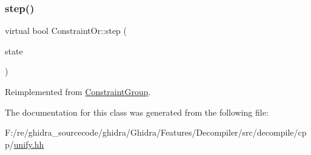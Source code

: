 \subsubsection{\texorpdfstring{step()}{step()}}
{\footnotesize\ttfamily virtual bool Constraint\+Or\+::step (\begin{DoxyParamCaption}\item[{\mbox{\hyperlink{class_unify_state}{Unify\+State}} \&}]{state }\end{DoxyParamCaption})\hspace{0.3cm}{\ttfamily [virtual]}}



Reimplemented from \mbox{\hyperlink{class_constraint_group_aeb75604b690052150d7a94392677dd20}{Constraint\+Group}}.



The documentation for this class was generated from the following file\+:\begin{DoxyCompactItemize}
\item 
F\+:/re/ghidra\+\_\+sourcecode/ghidra/\+Ghidra/\+Features/\+Decompiler/src/decompile/cpp/\mbox{\hyperlink{unify_8hh}{unify.\+hh}}\end{DoxyCompactItemize}
